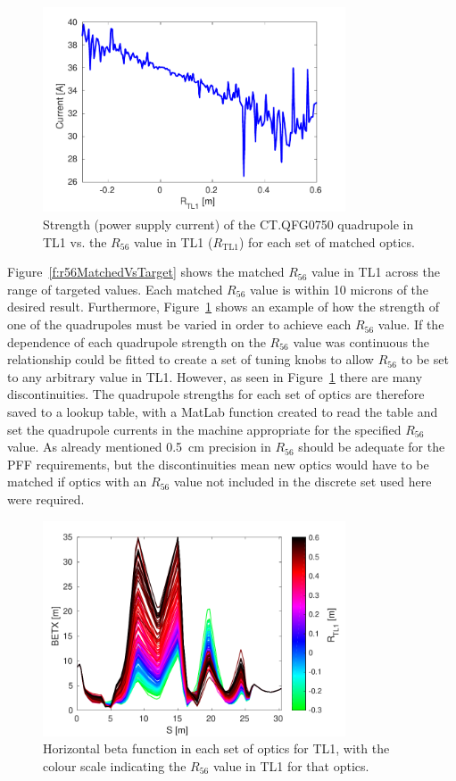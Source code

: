 \begin{figure}
  \centering
  \includegraphics[width=0.8\textwidth]{Figures/propagation/CTQFG0750}
  \caption{Strength (power supply current) of the CT.QFG0750 quadrupole in TL1 vs. the \(R_{56}\) value in TL1 (\(R_{\mathrm{TL1}}\)) for each set of matched optics.}
  \label{f:CTQFG0750}
\end{figure}

Figure~\ref{f:r56MatchedVsTarget} shows the matched \(R_{56}\) value in TL1 across the range of targeted values. Each matched \(R_{56}\) value is within 10 microns of the desired result. Furthermore, Figure~\ref{f:CTQFG0750}  shows an example of how the strength of one of the quadrupoles must be varied in order to achieve each \(R_{56}\) value. If the dependence of each quadrupole strength on the \(R_{56}\) value was continuous the relationship could be fitted to create a set of tuning knobs to allow \(R_{56}\) to be set to any arbitrary value in TL1. However, as seen in Figure~\ref{f:CTQFG0750} there are many discontinuities. The quadrupole strengths for each set of optics are therefore saved to a lookup table, with a MatLab function created to read the table and set the quadrupole currents in the machine appropriate for the specified \(R_{56}\) value. As already mentioned 0.5~cm precision in \(R_{56}\) should be adequate for the PFF requirements, but the discontinuities mean new optics would have to be matched if optics with an \(R_{56}\) value not included in the discrete set used here were required.

\begin{figure}
  \centering
  \includegraphics[width=0.8\textwidth]{Figures/propagation/BETX}
  \caption{Horizontal beta function in each set of optics for TL1, with the colour scale indicating the \(R_{56}\) value in TL1 for that optics.}
  \label{f:tl1BETX}
\end{figure}

